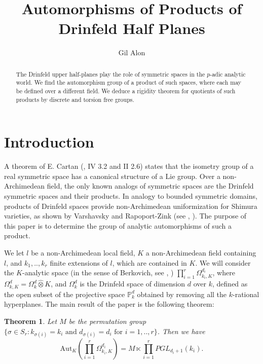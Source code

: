 \documentclass{amsart}
\theoremstyle{theorem}
\newtheorem{theorem}{Theorem}
\theoremstyle{lemma}
\theoremstyle{prop}
\theoremstyle{definition}
\theoremstyle{corollary}
\theoremstyle{remark}
\newcommand{\Aut}{\text{Aut}}
\begin{document}
\title{Automorphisms of Products of Drinfeld Half Planes}
\author{Gil Alon}
\address{Department of Mathematics and Computer Science, The Open University of Israel, P.O. Box 808, Raanana, Israel}


\begin{abstract}
The Drinfeld upper half-planes play the role of symmetric spaces in the $p$-adic analytic world. We find the automorphism group of a product of such spaces, where each may be defined over a different field. We deduce a rigidity theorem for quotients of such products by discrete and torsion free groups. 
\end{abstract}
\maketitle
\sloppy

\section{Introduction}
A theorem of E. Cartan (\cite{helg}, IV 3.2 and II 2.6) states that the isometry group of a real symmetric space has a canonical structure of a Lie group. Over a non-Archimedean field, the only known analogs of symmetric spaces are the Drinfeld symmetric spaces and their products. In analogy to bounded symmetric domains, products of Drinfeld spaces provide non-Archimedean uniformization for Shimura varieties, as shown by Varshavsky and Rapoport-Zink (see \cite{rap}, \cite{var}). The purpose of this paper is to determine the group of analytic automorphisms of such a product. 

We let $l$ be a non-Archimedean local field, $K$ a non-Archimedean field containing $l$, and $k_1,..,k_r$ finite extensions of $l$, which are contained in $K$. We will consider the $K$-analytic space (in the sense of Berkovich, see \cite{ber2}, \cite{ber4}) $\prod_{i=1}^r\Omega_{k_i,K}^{d_i}$, where $\Omega_{k,K}^d=\Omega_k^d\hat{\otimes}K$, and $\Omega_k^d$ is the Drinfeld space of dimension $d$ over $k$, defined as the open subset of the projective space $\mathbb{P}^{d}_k$ obtained by removing all the $k$-rational hyperplanes. The main result of the paper is the following theorem:

\begin{theorem} \label{T}
Let $M$ be the permutation group $\{\sigma \in S_r: k_{\sigma(i)}=k_i \text{ and } d_{\sigma(i)}=d_i \text{ for } i=1,..,r\}$. Then we have
$$ \Aut_K(\prod_{i=1}^r\Omega_{k_i,K}^{d_i})=M \ltimes \prod_{i=1}^rPGL_{d_i+1}(k_i). $$
\end{theorem}
\end{document}
